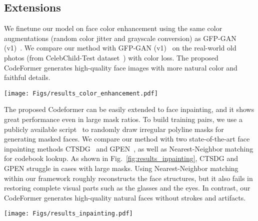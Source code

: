\subsection{Extensions}
We finetune our model on face color enhancement using the same color augmentations (random color jitter and grayscale conversion) as GFP-GAN  (v1)~\cite{wang2021towards}.
We compare our method with GFP-GAN (v1)~\cite{wang2021towards} on the real-world old photos (from CelebChild-Test dataset~\cite{wang2021towards}) with color loss. 
The proposed CodeFormer generates high-quality face images with more natural color and faithful details.
\begin{figure*}[ht]
\centering
	\texttt{[image: Figs/results\_color\_enhancement.pdf]}
	\vspace{-4mm}
	\caption{Visual comparison of face color enhancement on the real-world old face photos.}
	\label{fig:results_color_enhancement}
	\vspace{-2mm}
\end{figure*}


The proposed Codeformer can be easily extended to face inpainting, and it shows great performance even in large mask ratios.
To build training pairs, we use a publicly available script~\cite{yang2021gan} to randomly draw irregular polyline masks for generating masked faces. 
We compare our method with two state-of-the-art face inpainting methods CTSDG~\cite{guo2021image} and GPEN~\cite{yang2021gan}, as well as Nearest-Neighbor matching for codebook lookup. 
As shown in Fig.~\ref{fig:results_inpainting}, CTSDG and GPEN struggle in cases with large masks.
Using Nearest-Neighbor matching within our framework roughly reconstructs the face structures, but it also fails in restoring complete visual parts such as the glasses and the eyes.
In contrast, our CodeFormer generates high-quality natural faces without strokes and artifacts.
\begin{figure*}[ht]
\centering
	\texttt{[image: Figs/results\_inpainting.pdf]}
	\vspace{-4mm}
	\caption{Visual comparison with state-of-the-art face inpainting methods on the challenging cases.}
	\label{fig:results_inpainting}
	\vspace{-2mm}
\end{figure*}
